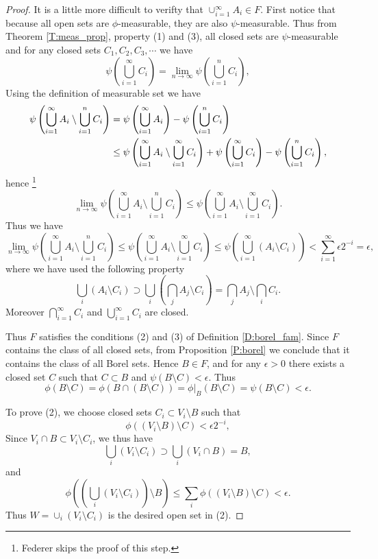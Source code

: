 \begin{proof}
It is a little more difficult to verifty that $\cup_{i=1}^{\infty} A_i \in F$.
First notice that because all open sets are $\phi$-measurable, they are also 
$\psi$-measurable. Thus from Theorem \ref{T:meas_prop}, property (1) and (3), 
all closed sets are $\psi$-measurable and for any closed sets 
$C_1,C_2,C_3,\cdots$ we have
\[
  \psi \left( \bigcup_{i=1}^{\infty} C_i \right)
    = \lim_{n\to\infty} \psi\left( \bigcup_{i=1}^n C_i \right),
\]
Using the definition of measurable set we have
\begin{align*}
  \psi \left( \bigcup_{i=1}^{\infty} A_i\setminus \bigcup_{i=1}^{n} C_i \right)
    &= \psi \left( \bigcup_{i=1}^{\infty} A_i \right)
      - \psi \left( \bigcup_{i=1}^{n} C_i \right) \notag\\
    &\leq 
      \psi \left( \bigcup_{i=1}^{\infty} A_i
                  \setminus \bigcup_{i=1}^{\infty} C_i \right)
      + \psi \left( \bigcup_{i=1}^{\infty} C_i \right)
      - \psi \left( \bigcup_{i=1}^{n} C_i \right),
\end{align*}
hence 
\footnote{Federer skips the proof of this step.}
\[
  \lim_{n\to\infty} \psi \left( \bigcup_{i=1}^{\infty} A_i\setminus 
       \bigcup_{i=1}^{n} C_i \right)
  \leq \psi \left( \bigcup_{i=1}^{\infty} A_i\setminus 
       \bigcup_{i=1}^{\infty} C_i \right).
\]
Thus we have
\[
  \lim_{n\to\infty} \psi \left( \bigcup_{i=1}^{\infty} A_i\setminus 
       \bigcup_{i=1}^{n} C_i \right)
  \leq \psi \left( \bigcup_{i=1}^{\infty} A_i\setminus 
       \bigcup_{i=1}^{\infty} C_i \right)
    \leq \psi \left( \bigcup_{i=1}^{\infty} ( A_i\setminus C_i ) \right)
    < \sum_{i=1}^{\infty} \epsilon 2^{-i} = \epsilon,
\]
where we have used the following property
\[
  \bigcup_i ( A_i\setminus C_i )
    \supset \bigcup_i \left( \bigcap_j A_j\setminus C_i \right) 
    = \bigcap_j A_j\setminus \bigcap_i C_i.
\]
Moreover $\bigcap_{i=1}^{\infty}C_i$ and $\bigcup_{i=1}^{\infty}C_i$ are closed.

Thus $F$ satisfies the conditions (2) and (3) of Definition \ref{D:borel_fam}.
Since $F$ contains the class of all closed sets, from Proposition \ref{P:borel}
we conclude that it contains the class of all Borel sets. Hence $B\in F$, and
for any $\epsilon>0$ there exists a closed set $C$ such that $C\subset B$ and
$\psi(B\setminus C)<\epsilon$. Thus
\[
  \phi(B\setminus C) = \phi(B\cap (B\setminus C)) = \phi|_B(B\setminus C)
  = \psi(B\setminus C) < \epsilon.
\]

To prove (2), we choose closed sets $C_i\subset V_i\setminus B$ such that
\[
  \phi( (V_i\setminus B)\setminus C) < \epsilon 2^{-i},
\]
Since $V_i\cap B\subset V_i\setminus C_i$, we thus have
\[
  \bigcup_i (V_i\setminus C_i) \supset \bigcup_i (V_i\cap B) = B, 
\]
and 
\[
  \phi \left( \left( \bigcup_i (V_i\setminus C_i) \right)
              \setminus B \right)
  \leq \sum_i \phi( (V_i\setminus B)\setminus C) < \epsilon. 
\]
Thus $W=\cup_i (V_i\setminus C_i)$ is the desired open set in (2).
\end{proof}   %


